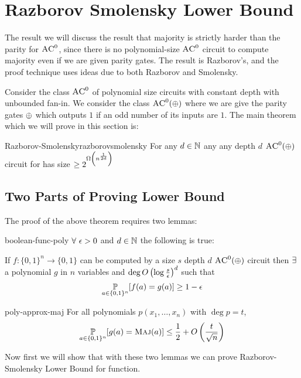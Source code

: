 \section{Razborov Smolensky Lower Bound}
The result we will discuss the result that majority is strictly harder than the parity for $\textsc{AC}^0$, since there is no polynomial-size $\textsc{AC}^0$ circuit to compute majority even if we are given parity gates. The result is Razborov’s, and the proof technique uses ideas due to both Razborov and Smolensky. 

Consider the class $\textsc{AC}^0$ of polynomial size circuits with constant depth  with unbounded fan-in. We consider the class $\textsc{AC}^0(\oplus)$ where we are give the parity gates $\oplus$ which outputs $1$ if an odd number of its inputs are $1$. The main theorem which we will prove in this section is:
\begin{theorem}{Razborov-Smolensky}{razborovsmolensky}
	For any $d\in\mathbb{N}$ any any depth $d$ $\textsc{AC}^0(\oplus)$ circuit for  has size $\geq 2^{\Omega\left(  n^{\frac{1}{2d}}\right)}$
\end{theorem}

\subsection{Two Parts of Proving Lower Bound}
The proof of the above theorem requires two lemmas:

\begin{lemma}{}{boolean-func-poly}
$\forall\ \eps>0$ and $d\in\mathbb{N}$ the following is true:\parinn

If $f:\{0,1\}^n\to \{0,1\}$ can be computed by a size $s$ depth $d$ $\textsc{AC}^0(\oplus)$ circuit then $\exists$ a polynomial $g$ in $n$ variables and $\deg O\left(\log \frac{s}{\epsilon}\right)^d$ such that $$\underset{a\in\{0,1\}^n}{\mathbb{P}}[f(a)=g(a)]\geq 1-\epsilon$$
\end{lemma}
\begin{lemma}{}{poly-approx-maj}
	For all polynomials $p(x_1,\dots, x_n)$ with $\deg p=t$, $$\underset{a\in\{0,1\}^n}{\mathbb{P}}[g(a)=\textsc{Maj}(a)]\leq \frac12+O\left(\frac{t}{\sqrt{n}}\right)$$
\end{lemma}


Now first we will show that with these two lemmas we can prove Razborov-Smolensky Lower Bound for  function.\vspace*{2mm}

